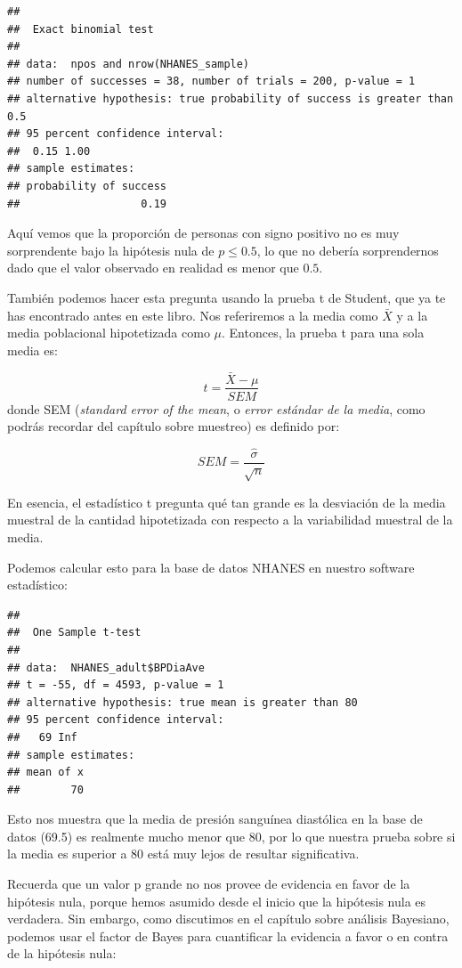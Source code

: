 \documentclass[
  12pt,
]{book}
\begin{document}
\begin{verbatim}
## 
##  Exact binomial test
## 
## data:  npos and nrow(NHANES_sample)
## number of successes = 38, number of trials = 200, p-value = 1
## alternative hypothesis: true probability of success is greater than 0.5
## 95 percent confidence interval:
##  0.15 1.00
## sample estimates:
## probability of success 
##                   0.19
\end{verbatim}

Aquí vemos que la proporción de personas con signo positivo no es muy sorprendente bajo la hipótesis nula de \(p \le 0.5\), lo que no debería sorprendernos dado que el valor observado en realidad es menor que \(0.5\).

También podemos hacer esta pregunta usando la prueba t de Student, que ya te has encontrado antes en este libro. Nos referiremos a la media como \(\bar{X}\) y a la media poblacional hipotetizada como \(\mu\). Entonces, la prueba t para una sola media es:

\[
t = \frac{\bar{X} - \mu}{SEM}
\]
donde SEM (\emph{standard error of the mean}, o \emph{error estándar de la media}, como podrás recordar del capítulo sobre muestreo) es definido por:

\[
SEM = \frac{\hat{\sigma}}{\sqrt{n}}
\]

En esencia, el estadístico t pregunta qué tan grande es la desviación de la media muestral de la cantidad hipotetizada con respecto a la variabilidad muestral de la media.

Podemos calcular esto para la base de datos NHANES en nuestro software estadístico:

\begin{verbatim}
## 
##  One Sample t-test
## 
## data:  NHANES_adult$BPDiaAve
## t = -55, df = 4593, p-value = 1
## alternative hypothesis: true mean is greater than 80
## 95 percent confidence interval:
##   69 Inf
## sample estimates:
## mean of x 
##        70
\end{verbatim}

Esto nos muestra que la media de presión sanguínea diastólica en la base de datos (69.5) es realmente mucho menor que 80, por lo que nuestra prueba sobre si la media es superior a 80 está muy lejos de resultar significativa.

Recuerda que un valor p grande no nos provee de evidencia en favor de la hipótesis nula, porque hemos asumido desde el inicio que la hipótesis nula es verdadera. Sin embargo, como discutimos en el capítulo sobre análisis Bayesiano, podemos usar el factor de Bayes para cuantificar la evidencia a favor o en contra de la hipótesis nula:
\end{document}
